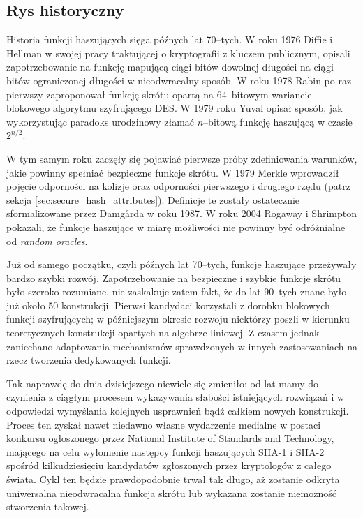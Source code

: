 \documentclass[12pt,a4paper,twoside]{article}
\begin{document}
\subsection{Rys historyczny}
Historia funkcji haszujących sięga późnych lat 70--tych. W roku 1976 Diffie i
Hellman w swojej pracy traktującej o kryptografii z kluczem publicznym, opisali
zapotrzebowanie na funkcję mapującą ciągi bitów dowolnej długości na ciągi
bitów ograniczonej długości w nieodwracalny sposób. W roku 1978 Rabin po raz
pierwszy zaproponował funkcję skrótu opartą na 64--bitowym wariancie blokowego
algorytmu szyfrującego DES. W 1979 roku Yuval opisał sposób, jak wykorzystując
paradoks urodzinowy złamać $n$--bitową funkcję haszującą w czasie $2^{n/2}$.

W tym samym roku zaczęły się pojawiać pierwsze próby zdefiniowania warunków,
jakie powinny spełniać bezpieczne funkcje skrótu. W 1979 Merkle wprowadził
pojęcie odporności na kolizje oraz odporności pierwszego i drugiego rzędu
(patrz sekcja \ref{sec:secure_hash_attributes}). Definicje te zostały
ostatecznie sformalizowane przez Damg\r{a}rda w roku 1987. W roku 2004 Rogaway
i Shrimpton pokazali, że funkcje haszujące w miarę możliwości nie powinny być
odróżnialne od \textit{random oracles}.

Już od samego początku, czyli późnych lat 70--tych, funkcje haszujące
przeżywały bardzo szybki rozwój. Zapotrzebowanie na bezpieczne i szybkie
funkcje skrótu było szeroko rozumiane, nie zaskakuje zatem fakt, że do lat
90--tych znane było już około 50 konstrukcji. Pierwsi kandydaci korzystali z
dorobku blokowych funkcji szyfrujących; w późniejszym okresie rozwoju niektórzy
poszli w kierunku teoretycznych konstrukcji opartych na algebrze liniowej. Z
czasem jednak zaniechano adaptowania mechanizmów sprawdzonych w innych
zastosowaniach na rzecz tworzenia dedykowanych funkcji.


Tak naprawdę do dnia dzisiejszego niewiele się zmieniło: od lat
mamy do czynienia z ciągłym procesem wykazywania słabości istniejących
rozwiązań i w odpowiedzi wymyślania kolejnych usprawnień bądź całkiem nowych
konstrukcji. Proces ten zyskał nawet niedawno własne wydarzenie medialne w
postaci konkursu ogłoszonego przez National Institute of Standards and
Technology, mającego na celu wyłonienie następcy funkcji haszujących SHA-1 i
SHA-2 spośród kilkudziesięciu kandydatów zgłoszonych przez kryptologów z całego
świata. Cykl ten będzie prawdopodobnie trwał tak długo, aż zostanie odkryta
uniwersalna nieodwracalna funkcja skrótu lub wykazana zostanie niemożność
stworzenia takowej.
\end{document}
